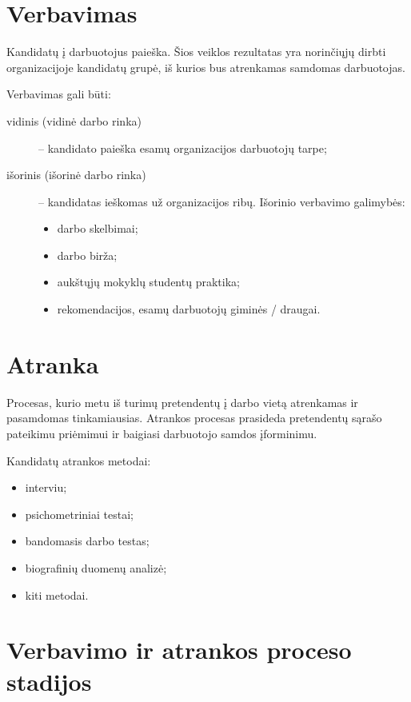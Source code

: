 \section{Verbavimas}

\begin{defn}[Verbavimas]
  Kandidatų į darbuotojus paieška. Šios veiklos rezultatas yra norinčiųjų
  dirbti organizacijoje kandidatų grupė, iš kurios bus atrenkamas
  samdomas darbuotojas.
\end{defn}

Verbavimas gali būti:
\begin{description}
  \item[vidinis (vidinė darbo rinka)] – kandidato paieška esamų
    organizacijos darbuotojų tarpe;
  \item[išorinis (išorinė darbo rinka)] – kandidatas ieškomas už
    organizacijos ribų. Išorinio verbavimo galimybės:
    \begin{itemize}
      \item darbo skelbimai;
      \item darbo birža;
      \item aukštųjų mokyklų studentų praktika;
      \item rekomendacijos, esamų darbuotojų giminės / draugai.
    \end{itemize}
\end{description}

\section{Atranka}

\begin{defn}[Atranka]
  Procesas, kurio metu iš turimų pretendentų į darbo vietą atrenkamas
  ir pasamdomas tinkamiausias. Atrankos procesas prasideda pretendentų
  sąrašo pateikimu priėmimui ir baigiasi darbuotojo samdos įforminimu.
\end{defn}

Kandidatų atrankos metodai:
\begin{itemize}
  \item interviu;
  \item psichometriniai testai;
  \item bandomasis darbo testas;
  \item biografinių duomenų analizė;
  \item kiti metodai.
\end{itemize}

\section{Verbavimo ir atrankos proceso stadijos}

